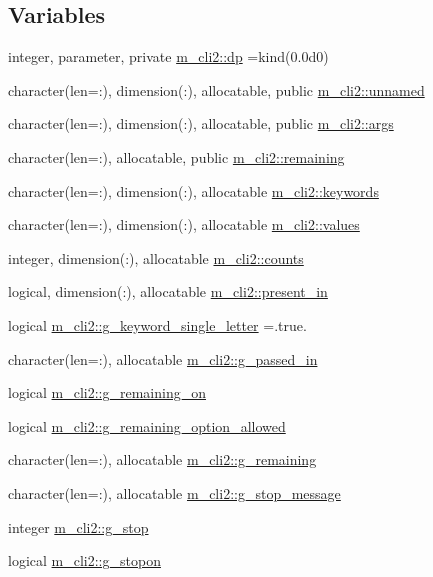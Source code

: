 \subsection*{Variables}
\begin{DoxyCompactItemize}
\item 
integer, parameter, private \mbox{\hyperlink{namespacem__cli2_acf83f1963cf6a56ad0221cfcf5402440}{m\+\_\+cli2\+::dp}} =kind(0.\+0d0)
\item 
character(len=\+:), dimension(\+:), allocatable, public \mbox{\hyperlink{namespacem__cli2_a5b03781cb432174f4ee8d734ecbb9604}{m\+\_\+cli2\+::unnamed}}
\item 
character(len=\+:), dimension(\+:), allocatable, public \mbox{\hyperlink{namespacem__cli2_a601970031be3351d1f14ce671934ffe7}{m\+\_\+cli2\+::args}}
\item 
character(len=\+:), allocatable, public \mbox{\hyperlink{namespacem__cli2_ae158de0b5e1d1a55bb297ed576e38273}{m\+\_\+cli2\+::remaining}}
\item 
character(len=\+:), dimension(\+:), allocatable \mbox{\hyperlink{namespacem__cli2_a314f3903115db4ab9e2ec03b540aec76}{m\+\_\+cli2\+::keywords}}
\item 
character(len=\+:), dimension(\+:), allocatable \mbox{\hyperlink{namespacem__cli2_af631ee3a1bca98e9fbf1f80646dae360}{m\+\_\+cli2\+::values}}
\item 
integer, dimension(\+:), allocatable \mbox{\hyperlink{namespacem__cli2_abf81746a55c2218c7f2de15602bc0be8}{m\+\_\+cli2\+::counts}}
\item 
logical, dimension(\+:), allocatable \mbox{\hyperlink{namespacem__cli2_adf9ffb8a34d1bd666fa91ed953bcb9f4}{m\+\_\+cli2\+::present\+\_\+in}}
\item 
logical \mbox{\hyperlink{namespacem__cli2_ad1fe6713ae917008c41792b9cad267b7}{m\+\_\+cli2\+::g\+\_\+keyword\+\_\+single\+\_\+letter}} =.true.
\item 
character(len=\+:), allocatable \mbox{\hyperlink{namespacem__cli2_a1945bae73d2d148bb01a15d89acd07cd}{m\+\_\+cli2\+::g\+\_\+passed\+\_\+in}}
\item 
logical \mbox{\hyperlink{namespacem__cli2_a81306eb55af0b7b6ab8aa2851c0bd8be}{m\+\_\+cli2\+::g\+\_\+remaining\+\_\+on}}
\item 
logical \mbox{\hyperlink{namespacem__cli2_af16d24ebf98bf90f8c7c32dda70eeb43}{m\+\_\+cli2\+::g\+\_\+remaining\+\_\+option\+\_\+allowed}}
\item 
character(len=\+:), allocatable \mbox{\hyperlink{namespacem__cli2_a9ff84c9aa401e7b45d9d86cd6b17bbcc}{m\+\_\+cli2\+::g\+\_\+remaining}}
\item 
character(len=\+:), allocatable \mbox{\hyperlink{namespacem__cli2_a0afc43936eba64e78b8920742ffb71e1}{m\+\_\+cli2\+::g\+\_\+stop\+\_\+message}}
\item 
integer \mbox{\hyperlink{namespacem__cli2_a07a17fd130c21dd97917a0f415cf302b}{m\+\_\+cli2\+::g\+\_\+stop}}
\item 
logical \mbox{\hyperlink{namespacem__cli2_ac2ad61c8af780de83b4adecc5d735d8b}{m\+\_\+cli2\+::g\+\_\+stopon}}
\end{DoxyCompactItemize}


